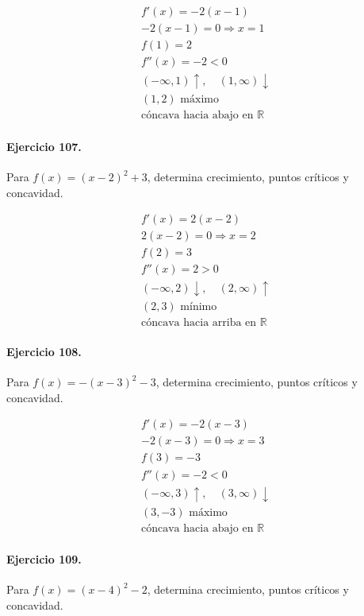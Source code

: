 \documentclass[11pt,a4paper]{article}
\begin{document}
\[
\begin{aligned}
f'(x)=-2(x-1)\\
-2(x-1)=0\Rightarrow x=1\\
f(1)=2\\
f''(x)=-2<0\\
(-\infty,1)\uparrow,\quad(1,\infty)\downarrow\\
(1,2)\text{ máximo}\\
\text{{cóncava hacia abajo en }}\mathbb{R}
\end{aligned}
\]


\paragraph{Ejercicio 107.} Para $f(x)=(x-2)^2+3$, determina crecimiento, puntos críticos y concavidad.

\[
\begin{aligned}
f'(x)=2(x-2)\\
2(x-2)=0\Rightarrow x=2\\
f(2)=3\\
f''(x)=2>0\\
(-\infty,2)\downarrow,\quad(2,\infty)\uparrow\\
(2,3)\text{ mínimo}\\
\text{{cóncava hacia arriba en }}\mathbb{R}
\end{aligned}
\]


\paragraph{Ejercicio 108.} Para $f(x)=-(x-3)^2-3$, determina crecimiento, puntos críticos y concavidad.

\[
\begin{aligned}
f'(x)=-2(x-3)\\
-2(x-3)=0\Rightarrow x=3\\
f(3)=-3\\
f''(x)=-2<0\\
(-\infty,3)\uparrow,\quad(3,\infty)\downarrow\\
(3,-3)\text{ máximo}\\
\text{{cóncava hacia abajo en }}\mathbb{R}
\end{aligned}
\]


\paragraph{Ejercicio 109.} Para $f(x)=(x-4)^2-2$, determina crecimiento, puntos críticos y concavidad.
\end{document}
